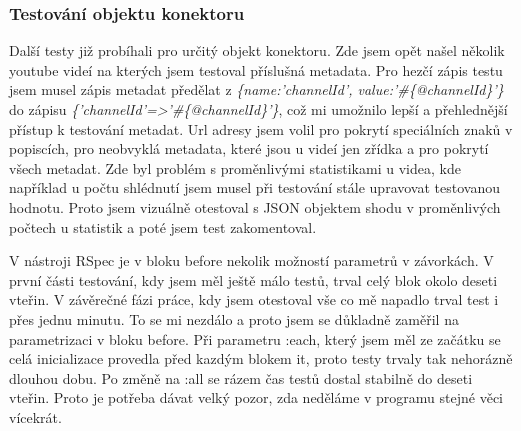 \subsubsection{Testování objektu konektoru}
\par Další testy již probíhali pro určitý objekt konektoru. Zde jsem opět našel několik youtube videí na kterých jsem testoval příslušná metadata. Pro hezčí zápis testu jsem musel zápis metadat předělat z \textit{\{name:'channelId', value:'\#\{@channelId\}'\}} do zápisu \textit{\{'channelId'=>'\#\{@channelId\}'\}}, což mi umožnilo lepší a přehlednější přístup k testování metadat. Url adresy jsem volil pro pokrytí speciálních znaků v popiscích, pro neobvyklá metadata, které jsou u videí jen zřídka a pro pokrytí všech metadat. Zde byl problém s proměnlivými statistikami u videa, kde například u počtu shlédnutí jsem musel při testování stále upravovat testovanou hodnotu. Proto jsem vizuálně otestoval s JSON objektem shodu v proměnlivých počtech u statistik a poté jsem test zakomentoval.
\par V nástroji RSpec je v bloku before nekolik možností parametrů v závorkách. V první části testování, kdy jsem měl ještě málo testů, trval celý blok okolo deseti vteřin. V závěrečné fázi práce, kdy jsem otestoval vše co mě napadlo trval test i přes jednu minutu. To se mi nezdálo a proto jsem se důkladně zaměřil na parametrizaci v bloku before. Při parametru :each, který jsem měl ze začátku se celá inicializace provedla před kazdým blokem it, proto testy trvaly tak nehorázně dlouhou dobu. Po změně na :all se rázem čas testů dostal stabilně do deseti vteřin. Proto je potřeba dávat velký pozor, zda neděláme v programu stejné věci vícekrát.
